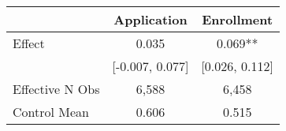 \begin{tabular}{lcc}
\hline
                      & \textbf{Application}     & \textbf{Enrollment}\\ \hline
Effect  &    0.035           &           0.069**          \\
                      & [-0.007, 0.077]  &   [0.026, 0.112]    \\ \hline
 Effective N Obs & 6,588 & 6,458 \\
Control Mean & 0.606 & 0.515 \\ \hline
\end{tabular}